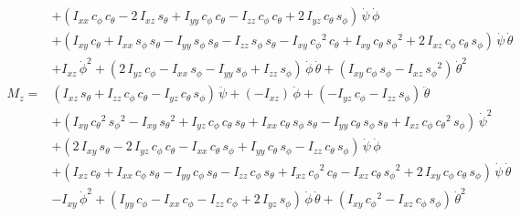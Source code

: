 \documentclass[a4paper]{article}
\begin{document}
\[\begin{aligned}
         &+\left(I_{xx}\,c_\phi\,c_\theta-2\,I_{xz}\,s_\theta+I_{yy}\,c_\phi\,c_\theta-I_{zz}\,c_\phi\,c_\theta+2\,I_{yz}\,c_\theta\,s_\phi\right)\,\dot{\psi}\,\dot{\phi} \\
         &+\left(I_{xy}\,c_\theta+I_{xx}\,s_\phi\,s_\theta-I_{yy}\,s_\phi\,s_\theta-I_{zz}\,s_\phi\,s_\theta-I_{xy}\,{c_\phi}^2\,c_\theta+I_{xy}\,c_\theta\,{s_\phi}^2+2\,I_{xz}\,c_\phi\,c_\theta\,s_\phi\right)\,\dot{\psi}\,\dot{\theta} \\
         &+I_{xz}\,{\dot{\phi}}^2+\left(2\,I_{yz}\,c_\phi-I_{xx}\,s_\phi-I_{yy}\,s_\phi+I_{zz}\,s_\phi\right)\,\dot{\phi}\,\dot{\theta}+\left(I_{xy}\,c_\phi\,s_\phi-I_{xz}\,{s_\phi}^2\right)\,{\dot{\theta}}^2 \\
    M_z =&
\left(I_{xz}\,s_\theta+I_{zz}\,c_\phi\,c_\theta-I_{yz}\,c_\theta\,s_\phi\right)\,\ddot{\psi}+\left(-I_{xz}\right)\,\ddot{\phi}+\left(-I_{yz}\,c_\phi-I_{zz}\,s_\phi\right)\,\ddot{\theta} \\
         &+\left(I_{xy}\,{c_\theta}^2\,{s_\phi}^2-I_{xy}\,{s_\theta}^2+I_{yz}\,c_\phi\,c_\theta\,s_\theta+I_{xx}\,c_\theta\,s_\phi\,s_\theta-I_{yy}\,c_\theta\,s_\phi\,s_\theta+I_{xz}\,c_\phi\,{c_\theta}^2\,s_\phi\right)\,{\dot{\psi}}^2 \\
         &+\left(2\,I_{xy}\,s_\theta-2\,I_{yz}\,c_\phi\,c_\theta-I_{xx}\,c_\theta\,s_\phi+I_{yy}\,c_\theta\,s_\phi-I_{zz}\,c_\theta\,s_\phi\right)\,\dot{\psi}\,\dot{\phi} \\
         &+\left(I_{xz}\,c_\theta+I_{xx}\,c_\phi\,s_\theta-I_{yy}\,c_\phi\,s_\theta-I_{zz}\,c_\phi\,s_\theta+I_{xz}\,{c_\phi}^2\,c_\theta-I_{xz}\,c_\theta\,{s_\phi}^2+2\,I_{xy}\,c_\phi\,c_\theta\,s_\phi\right)\,\dot{\psi}\,\dot{\theta} \\
         &-I_{xy}\,{\dot{\phi}}^2+\left(I_{yy}\,c_\phi-I_{xx}\,c_\phi-I_{zz}\,c_\phi+2\,I_{yz}\,s_\phi\right)\,\dot{\phi}\,\dot{\theta}+\left(I_{xy}\,{c_\phi}^2-I_{xz}\,c_\phi\,s_\phi\right)\,{\dot{\theta}}^2
  \end{aligned}
\]
\end{document}
